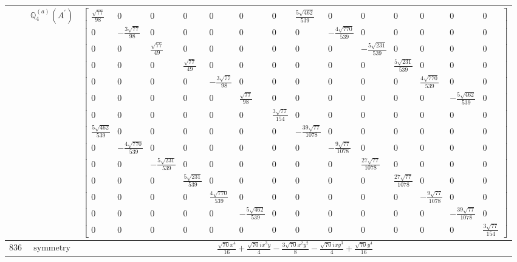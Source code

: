 \documentclass[fleqn,8pt,landscape]{jsarticle}
\begin{document}
\begin{longtable}{ccc}
$  $ & $ \mathbb{Q}_{4}^{(a)}(A^{\prime}) $ & $ \begin{bmatrix} \frac{\sqrt{77}}{98} & 0 & 0 & 0 & 0 & 0 & 0 & \frac{5 \sqrt{462}}{539} & 0 & 0 & 0 & 0 & 0 & 0 \\ 0 & - \frac{3 \sqrt{77}}{98} & 0 & 0 & 0 & 0 & 0 & 0 & - \frac{4 \sqrt{770}}{539} & 0 & 0 & 0 & 0 & 0 \\ 0 & 0 & \frac{\sqrt{77}}{49} & 0 & 0 & 0 & 0 & 0 & 0 & - \frac{5 \sqrt{231}}{539} & 0 & 0 & 0 & 0 \\ 0 & 0 & 0 & \frac{\sqrt{77}}{49} & 0 & 0 & 0 & 0 & 0 & 0 & \frac{5 \sqrt{231}}{539} & 0 & 0 & 0 \\ 0 & 0 & 0 & 0 & - \frac{3 \sqrt{77}}{98} & 0 & 0 & 0 & 0 & 0 & 0 & \frac{4 \sqrt{770}}{539} & 0 & 0 \\ 0 & 0 & 0 & 0 & 0 & \frac{\sqrt{77}}{98} & 0 & 0 & 0 & 0 & 0 & 0 & - \frac{5 \sqrt{462}}{539} & 0 \\ 0 & 0 & 0 & 0 & 0 & 0 & \frac{3 \sqrt{77}}{154} & 0 & 0 & 0 & 0 & 0 & 0 & 0 \\ \frac{5 \sqrt{462}}{539} & 0 & 0 & 0 & 0 & 0 & 0 & - \frac{39 \sqrt{77}}{1078} & 0 & 0 & 0 & 0 & 0 & 0 \\ 0 & - \frac{4 \sqrt{770}}{539} & 0 & 0 & 0 & 0 & 0 & 0 & - \frac{9 \sqrt{77}}{1078} & 0 & 0 & 0 & 0 & 0 \\ 0 & 0 & - \frac{5 \sqrt{231}}{539} & 0 & 0 & 0 & 0 & 0 & 0 & \frac{27 \sqrt{77}}{1078} & 0 & 0 & 0 & 0 \\ 0 & 0 & 0 & \frac{5 \sqrt{231}}{539} & 0 & 0 & 0 & 0 & 0 & 0 & \frac{27 \sqrt{77}}{1078} & 0 & 0 & 0 \\ 0 & 0 & 0 & 0 & \frac{4 \sqrt{770}}{539} & 0 & 0 & 0 & 0 & 0 & 0 & - \frac{9 \sqrt{77}}{1078} & 0 & 0 \\ 0 & 0 & 0 & 0 & 0 & - \frac{5 \sqrt{462}}{539} & 0 & 0 & 0 & 0 & 0 & 0 & - \frac{39 \sqrt{77}}{1078} & 0 \\ 0 & 0 & 0 & 0 & 0 & 0 & 0 & 0 & 0 & 0 & 0 & 0 & 0 & \frac{3 \sqrt{77}}{154} \end{bmatrix} $ \\ \hline
$ 836 $ & $ \text{symmetry} $ & $ \frac{\sqrt{70} x^{4}}{16} + \frac{\sqrt{70} i x^{3} y}{4} - \frac{3 \sqrt{70} x^{2} y^{2}}{8} - \frac{\sqrt{70} i x y^{3}}{4} + \frac{\sqrt{70} y^{4}}{16} $ \\

\end{longtable}
\end{document}
